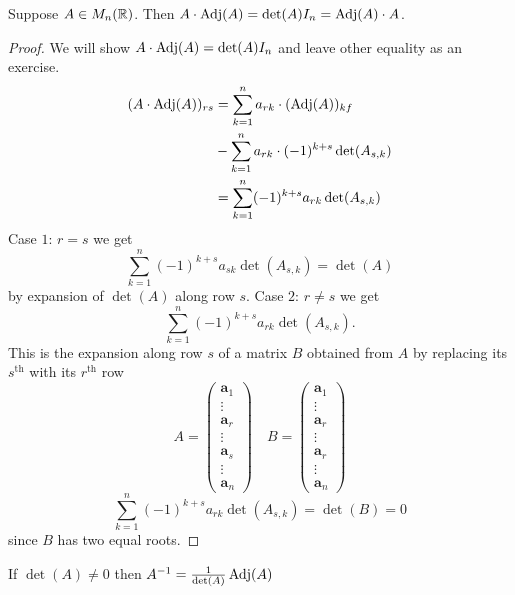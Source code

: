 \documentclass[10pt, a4paper]{article}
\newcommand{\mbf}[1]{\mathbf{#1}}
\begin{document}
\begin{proposition}
    Suppose $A \in M_n(\mathbb{R})$.
    Then
    $A \cdot \operatorname{Adj}(A) = \det(A)I_n = \operatorname{Adj}(A) \cdot A$.
    \begin{proof}
        We will show $A \cdot \operatorname{Adj}(A) = \det(A)I_n$ and leave other equality as an exercise.
        \begin{align*}
            (A \cdot \operatorname{Adj}(A))_{rs} &= \sum_{k = 1}^{n}a_{rk} \cdot (\operatorname{Adj}(A))_{kf} \\
            &- \sum_{k = 1}^{n}a_{rk}\cdot(-1) ^ {k + s}\det(A_{s, k}) \\
            &= \sum_{k = 1}^{n}(-1) ^ {k + s}a_{rk}\det(A_{s, k})
        \end{align*}
        Case $1$: $r = s$ we get
        \[
        \sum_{k = 1}^{n}(-1) ^ {k + s}a_{sk}\det(A_{s, k}) = \det(A)
        \]
        by expansion of $\det(A)$ along row $s$.
        Case $2$: $r \neq s$ we get
        \[
        \sum_{k = 1}^{n}(-1) ^ {k + s}a_{rk}\det(A_{s, k}).
        \]
        This is the expansion along row $s$ of a matrix $B$ obtained from $A$ by replacing its $s^{\text{th}}$ with its $r^{\text{th}}$ row
        \[
        A = \begin{pmatrix}
            \mbf{a}_1 \\ \vdots \\ \mbf{a}_r \\ \vdots \\ \mbf{a}_s \\ \vdots \\ \mbf{a}_n
        \end{pmatrix}
        \quad
        B = \begin{pmatrix}
            \mbf{a}_1 \\ \vdots \\ \mbf{a}_r \\ \vdots \\ \mbf{a}_r \\ \vdots \\ \mbf{a}_n
        \end{pmatrix}
        \]
        \[
        \sum_{k = 1}^{n}(-1) ^ {k + s}a_{rk}\det(A_{s, k}) = \det(B) = 0
        \]
        since $B$ has two equal roots.
    \end{proof}
\end{proposition}
\begin{corollary}
    If $\det(A) \neq 0$ then
    $A ^ {-1} = \frac{1}{\det(A)}\operatorname{Adj}(A)$
\end{corollary}
\end{document}

